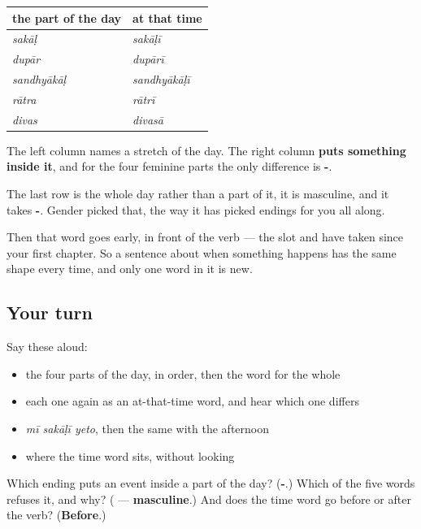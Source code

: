 \begin{grammarlens}[title={Grammar Lens: one ending, every part of the day}]
\noindent
\begin{tabularx}{\linewidth}{@{}>{\raggedright\arraybackslash}X>{\raggedright\arraybackslash}X@{}}
\toprule
\textbf{the part of the day} & \textbf{at that time} \\
\midrule
\textbf{\mr{सकाळ}} \emph{sakāḷ} & \textbf{\mr{सकाळी}} \emph{sakāḷī} \\
\textbf{\mr{दुपार}} \emph{dupār} & \textbf{\mr{दुपारी}} \emph{dupārī} \\
\textbf{\mr{संध्याकाळ}} \emph{sandhyākāḷ} & \textbf{\mr{संध्याकाळी}} \emph{sandhyākāḷī} \\
\textbf{\mr{रात्र}} \emph{rātra} & \textbf{\mr{रात्री}} \emph{rātrī} \\
\textbf{\mr{दिवस}} \emph{divas} & \textbf{\mr{दिवसा}} \emph{divasā} \\
\bottomrule
\end{tabularx}

The left column names a stretch of the day. The right column \textbf{puts something inside it}, and for the four feminine parts the only difference is \textbf{-}.

The last row is the whole day rather than a part of it, it is masculine, and it takes \textbf{-}. Gender picked that, the way it has picked endings for you all along.

Then that word goes early, in front of the verb — the slot \textbf{} and \textbf{} have taken since your first chapter. So a sentence about when something happens has the same shape every time, and only one word in it is new.
\end{grammarlens}

\subsection*{Your turn}
Say these aloud:

\begin{itemize}
\raggedright
  \item the four parts of the day, in order, then the word for the whole
  \item each one again as an at-that-time word, and hear which one differs
  \item \emph{mī sakāḷī yeto}, then the same with the afternoon
  \item where the time word sits, without looking
\end{itemize}

\begin{tcolorbox}[breakable,colback=teal!4,colframe=teal!35!black,title={Before you move on}]
Which ending puts an event inside a part of the day? (\textbf{-}.) Which of the five words refuses it, and why? (\emph{\textbf{}} — \textbf{masculine}.) And does the time word go before or after the verb? (\textbf{Before}.)
\end{tcolorbox}
